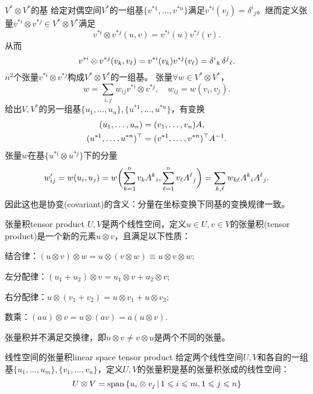 \begin{example}{$V^\ast\otimes V^\ast$的基}{}
	给定对偶空间$V^\ast$的一组基$\{v^{\ast 1},\ldots,v^{\ast n}\}$满足$v^{\ast i}(v_j)=\delta^i{}_j$。继而定义张量$v^{\ast i}\otimes v^{\ast j}\in V^\ast\otimes V^\ast$满足
	\[
		v^{\ast i}\otimes v^{\ast j}(u,v)=v^{\ast i}(u)v^{\ast j}(v).
	\]
	从而
	\[
		v^{\ast i}\otimes v^{\ast j}(v_k,v_\ell)=v^{\ast i}(v_k)v^{\ast j}(v_\ell)=\delta^i{}_k\mathop{}\!\delta^j{}_\ell.
	\]
	$n^2$个张量$v^{\ast i}\otimes v^{\ast j}$构成$V^\ast\otimes V^\ast$的一组基。
	\tcblower
	张量$\forall w\in V^\ast\otimes V^\ast$，
	\[
		w=\sum_{i,j}w_{ij}v^{\ast i}\otimes v^{\ast j},\quad w_{ij}=w(v_i,v_j).
	\]
	给出$V,V^\ast$的另一组基$\{u_1,\ldots,u_n\},\{u^{\ast 1},\ldots,u^{\ast n}\}$，有变换
	\begin{align*}
		(u_1,\ldots,u_n)&=(v_1,\ldots,v_n)A,\\
		(u^{\ast 1},\ldots,u^{\ast n})^\top&=(v^{\ast 1},\ldots,v^{\ast n})^\top A^{-1}.
	\end{align*}
	张量$w$在基$\{u^{\ast i}\otimes u^{\ast j}\}$下的分量
	\[
		w'_{ij}=w(u_i,u_j)=w\biggl(\sum_{k=1}^nv_kA^k{}_i,\sum_{\ell=1}^nv_\ell A^\ell{}_j\biggr)=\sum_{k,\ell}w_{k\ell}A^k{}_iA^\ell{}_j.
	\]
	因此这也是协变(covariant)的含义：分量在坐标变换下同基的变换规律一致。
\end{example}
\begin{definition}{张量积}{tensor product}
	$U,V$是两个线性空间，定义$u\in U,v\in V$的张量积(tensor product)是一个新的元素$u\otimes v$，且满足以下性质：
	\begin{compactitem}
		\item 结合律：$(u\otimes v)\otimes w=u\otimes(v\otimes w)\equiv u\otimes v\otimes w;$
		\item 左分配律：$(u_1+u_2)\otimes v=u_1\otimes v+u_2\otimes v;$
		\item 右分配律：$u\otimes(v_1+v_2)=u\otimes v_1+u\otimes v_2;$
		\item 数乘：$(au)\otimes v=u\otimes(av)=a(u\otimes v).$
	\end{compactitem}
\end{definition}
\begin{remark}
	张量积并不满足交换律，即$u\otimes v\neq v\otimes u$是两个不同的张量。
\end{remark}
\begin{definition}{线性空间的张量积}{linear space tensor product}
	给定两个线性空间$U,V$和各自的一组基$\{u_1,\ldots,u_m\},\{v_1,\ldots,v_n\}$，定义$U,V$的张量积是基的张量积张成的线性空间：
	\begin{equation}
		U\otimes V=\operatorname{span}\left\{u_i\otimes v_j\,\middle\vert\,1\leqslant i\leqslant m,1\leqslant j\leqslant n\right\}
	\end{equation}
\end{definition}
